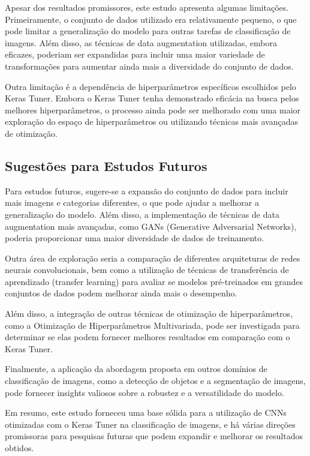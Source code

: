 \documentclass{article}
\begin{document}
Apesar dos resultados promissores, este estudo apresenta algumas limitações. Primeiramente, o conjunto de dados utilizado era relativamente pequeno, o que pode limitar a generalização do modelo para outras tarefas de classificação de imagens. Além disso, as técnicas de data augmentation utilizadas, embora eficazes, poderiam ser expandidas para incluir uma maior variedade de transformações para aumentar ainda mais a diversidade do conjunto de dados.

Outra limitação é a dependência de hiperparâmetros específicos escolhidos pelo Keras Tuner. Embora o Keras Tuner tenha demonstrado eficácia na busca pelos melhores hiperparâmetros, o processo ainda pode ser melhorado com uma maior exploração do espaço de hiperparâmetros ou utilizando técnicas mais avançadas de otimização.

\subsection{Sugestões para Estudos Futuros}

Para estudos futuros, sugere-se a expansão do conjunto de dados para incluir mais imagens e categorias diferentes, o que pode ajudar a melhorar a generalização do modelo. Além disso, a implementação de técnicas de data augmentation mais avançadas, como GANs (Generative Adversarial Networks), poderia proporcionar uma maior diversidade de dados de treinamento.

Outra área de exploração seria a comparação de diferentes arquiteturas de redes neurais convolucionais, bem como a utilização de técnicas de transferência de aprendizado (transfer learning) para avaliar se modelos pré-treinados em grandes conjuntos de dados podem melhorar ainda mais o desempenho.

Além disso, a integração de outras técnicas de otimização de hiperparâmetros, como a Otimização de Hiperparâmetros Multivariada, pode ser investigada para determinar se elas podem fornecer melhores resultados em comparação com o Keras Tuner.

Finalmente, a aplicação da abordagem proposta em outros domínios de classificação de imagens, como a detecção de objetos e a segmentação de imagens, pode fornecer insights valiosos sobre a robustez e a versatilidade do modelo.

Em resumo, este estudo forneceu uma base sólida para a utilização de CNNs otimizadas com o Keras Tuner na classificação de imagens, e há várias direções promissoras para pesquisas futuras que podem expandir e melhorar os resultados obtidos.
\end{document}
